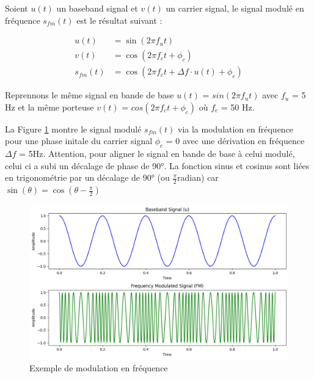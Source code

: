 \vspace{0.1cm}

Soient $u(t)$ un baseband signal et $v(t)$ un carrier signal, le signal modulé en fréquence $s_{fm}(t)$ est le résultat suivant :

\begin{align}
    u(t) &= \sin(2\pi f_{u}t) \\
    v(t) &= \cos(2\pi f_{c}t + \phi_{c}) \\
    s_{fm}(t) &= \cos\left(2\pi f_{c}t + \Delta f \cdot u(t) + \phi_{c}\right)
\end{align}

\vspace{0.1cm}

Reprennons le même signal en bande de base 
$u(t)$ = $sin(2\pi f_{u}t)$ avec $f_{u}$ = 5 Hz et la même porteuse 
$v(t)$ = $cos(2\pi f_{c}t + \phi_{c})$ où $f_{c}$ = 50 Hz.

\vspace{0.1cm}

La Figure \ref{term2} montre le signal modulé $s_{fm}(t)$ via la modulation en fréquence pour une phase initale du carrier signal $\phi_{c}$ = 0 avec une dérivation en fréquence $\Delta f$ = 5Hz. Attention, pour aligner le signal en bande de base à celui modulé, celui ci a subi un décalage de phase de 90°. La fonction sinus et cosinus sont liées en trigonométrie par un décalage de 90° (ou $\frac{\pi}{2} $radian) car $\sin(\theta) = \cos(\theta-\frac{\pi}{2})$

\newpage

\begin{figure}[h]
\centering

\includegraphics[scale=0.5]{images/FM_mod.PNG}
\caption{Exemple de modulation en fréquence}\label{term2}
\end{figure}

